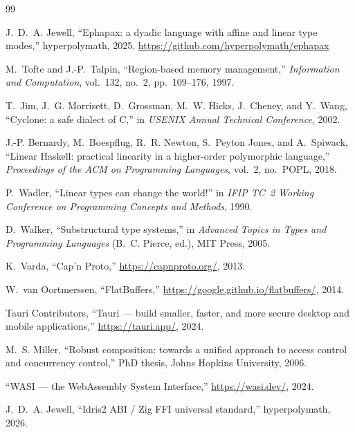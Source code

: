 \documentclass[11pt,a4paper]{article}
\theoremstyle{definition}
\begin{document}
\begin{thebibliography}{99}

J.~D.~A. Jewell, ``Ephapax: a dyadic language with affine and linear
type modes,'' hyperpolymath, 2025.
\url{https://github.com/hyperpolymath/ephapax}

M.~Tofte and J.-P.~Talpin, ``Region-based memory management,''
\textit{Information and Computation}, vol.~132, no.~2, pp.~109--176,
1997.

T.~Jim, J.~G. Morrisett, D.~Grossman, M.~W. Hicks, J.~Cheney, and
Y.~Wang, ``Cyclone: a safe dialect of C,'' in \textit{USENIX Annual
Technical Conference}, 2002.

J.-P. Bernardy, M.~Boespflug, R.~R. Newton, S.~Peyton Jones, and
A.~Spiwack, ``Linear Haskell: practical linearity in a higher-order
polymorphic language,'' \textit{Proceedings of the ACM on Programming
Languages}, vol.~2, no.~POPL, 2018.

P.~Wadler, ``Linear types can change the world!'' in \textit{IFIP TC~2
Working Conference on Programming Concepts and Methods}, 1990.

D.~Walker, ``Substructural type systems,'' in \textit{Advanced Topics
in Types and Programming Languages} (B.~C. Pierce, ed.), MIT Press,
2005.

K.~Varda, ``Cap'n Proto,'' \url{https://capnproto.org/}, 2013.

W.~van Oortmerssen, ``FlatBuffers,''
\url{https://google.github.io/flatbuffers/}, 2014.

Tauri Contributors, ``Tauri --- build smaller, faster, and more secure
desktop and mobile applications,'' \url{https://tauri.app/}, 2024.

M.~S. Miller, ``Robust composition: towards a unified approach to
access control and concurrency control,'' PhD thesis, Johns Hopkins
University, 2006.

``WASI --- the WebAssembly System Interface,''
\url{https://wasi.dev/}, 2024.

J.~D.~A. Jewell, ``Idris2 ABI / Zig FFI universal standard,''
hyperpolymath, 2026.

\end{thebibliography}
\end{document}
